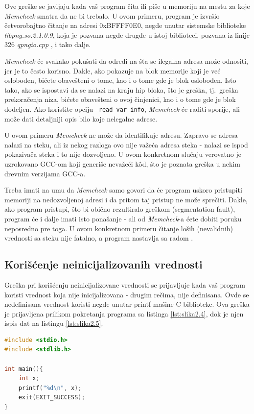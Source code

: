 \documentclass[12pt,oneside]{memoir}
\theoremstyle{plain}
\theoremstyle{definition}
\begin{document}
Ove greške se javljaju kada vaš program čita ili piše u memoriju na mestu za koje \textit{Memcheck} smatra da ne bi trebalo. U ovom primeru, program je izvršio četvorobajtno čitanje na adresi 0xBFFFF0E0, negde unutar sistemske biblioteke \textit{libpng.so.2.1.0.9}, koja je pozvana negde drugde u istoj biblioteci, pozvana iz linije 326 \textit{qpngio.cpp} , i tako dalje.

\textit{Memcheck} će svakako pokušati da odredi na šta se ilegalna adresa može odnositi, jer je to često korisno. Dakle, ako pokazuje na blok memorije koji je već oslobođen, bićete obavešteni o tome, kao i o tome gde je blok oslobođen. Isto tako, ako se ispostavi da se nalazi na kraju hip bloka, što je greška, tj.~greška prekoračenja niza, bićete obavešteni o ovoj činjenici, kao i o tome gde je blok dodeljen. Ako koristite opciju \texttt{--read-var-info}, \textit{Memcheck} će raditi sporije, ali može dati detaljniji opis bilo koje nelegalne adrese.

U ovom primeru \textit{Memcheck} ne može da identifikuje adresu. Zapravo se adresa nalazi na steku, ali iz nekog razloga ovo nije važeća adresa steka - nalazi se ispod pokazivača steka i to nije dozvoljeno. U ovom konkretnom slučaju verovatno je uzrokovano GCC-om koji generiše nevažeći k\^od, što je poznata greška u nekim drevnim verzijama GCC-a.

Treba imati na umu da \textit{Memcheck} samo govori da će program uskoro pristupiti memoriji na nedozvoljenoj adresi i da pritom taj pristup ne može sprečiti. Dakle, ako program pristupi, što bi obično rezultiralo greškom (segmentation fault), program će i dalje imati isto ponašanje - ali od \textit{Memcheck}-a ćete dobiti poruku neposredno pre toga. U ovom konkretnom primeru čitanje loših (nevalidnih) vrednosti sa steku nije fatalno, a program nastavlja sa radom \cite{Memcheck}. 

\subsection{Korišćenje neinicijalizovanih vrednosti}
Greška pri korišćenju neinicijalizovane vrednosti se prijavljuje kada vaš program koristi vrednost koja nije inicijalizovana - drugim rečima, nije definisana. Ovde se nedefinisana vrednost koristi negde unutar printf mašine C biblioteke. Ova greška je prijavljena prilikom pokretanja programa sa listinga \ref{lst:slika2.4}, dok je njen ispis dat na listingu \ref{lst:slika2.5}.

\begin{lstlisting}[style=mystyle,caption={Program koji izaziva grešku korišćenja neinicijalizovanih vrednosti}, label={lst:slika2.4},language={C}] 
#include <stdio.h>
#include <stdlib.h>

int main(){
	int x;
	printf("%d\n", x);
	exit(EXIT_SUCCESS);
}
\end{lstlisting}
\end{document}

